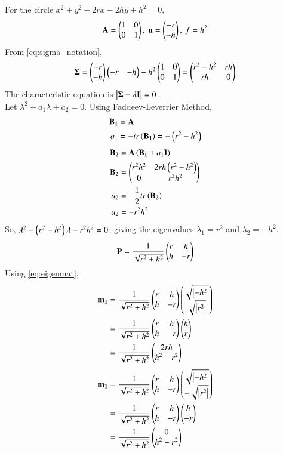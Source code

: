 \documentclass[journal]{IEEEtran}
\begin{document}
For the circle $x^2+y^2-2rx-2hy+h^2=0$,
\begin{align}
    \mathbf{A} = \begin{pmatrix}1 & 0 \\ 0 & 1\end{pmatrix},\text{ }\mathbf{u} = \begin{pmatrix}-r \\ -h\end{pmatrix},\text{ }f = h^2
\end{align}
From \eqref{eq:sigma_notation},
\begin{align}
    \mathbf{\Sigma} = \begin{pmatrix}-r \\ -h\end{pmatrix}\begin{pmatrix}-r & -h\end{pmatrix} - h^2\begin{pmatrix}1 & 0 \\ 0 & 1\end{pmatrix} = \begin{pmatrix}r^2-h^2 & rh \\ rh & 0\end{pmatrix}
\end{align}
The characteristic equation is $\begin{vmatrix}\mathbf{\Sigma}-\lambda\mathbf{I}\end{vmatrix}=0$. \\
Let $\lambda^2 + a_1 \lambda + a_2 = 0$. Using Faddeev-Leverrier Method,
\begin{align}
    \mathbf{B_1} &= \mathbf{A} \\
    a_1 &= - tr\left(\mathbf{B_1}\right) = -\left(r^2-h^2\right)
\end{align}
\begin{align}
    \mathbf{B_2} &= \mathbf{A}\left(\mathbf{B_1} + a_1\mathbf{I}\right) \\
    \mathbf{B_2} &= \begin{pmatrix}r^2h^2 & 2rh\left(r^2-h^2\right) \\ 0 & r^2h^2\end{pmatrix} \\
    a_2 &= -\frac{1}{2}tr\left(\mathbf{B_2}\right) \\
    a_2 &= -r^2h^2
\end{align}
So, $\lambda^2 - \left(r^2-h^2\right)\lambda - r^2h^2 = 0$, giving the eigenvalues $\lambda_1 = r^2$ and $\lambda_2 = -h^2$.
\begin{align}
    \mathbf{P} = \frac{1}{\sqrt{r^2+h^2}}\begin{pmatrix}r & h \\ h & -r\end{pmatrix}
\end{align}
Using \eqref{eq:eigenmat},
\begin{align}
    \mathbf{m_1} &= \frac{1}{\sqrt{r^2+h^2}}\begin{pmatrix}r & h \\ h & -r\end{pmatrix}\begin{pmatrix}\sqrt{\left\vert-h^2\right\vert} \\ \sqrt{\left\vert r^2\right\vert}\end{pmatrix} \\
    &= \frac{1}{\sqrt{r^2+h^2}}\begin{pmatrix}r & h \\ h & -r\end{pmatrix}\begin{pmatrix}h \\ r\end{pmatrix} \\
    &= \frac{1}{\sqrt{r^2+h^2}}\begin{pmatrix}2rh \\ h^2-r^2\end{pmatrix} \label{eq:equation1}
\end{align}
\begin{align}
    \mathbf{m_1} &= \frac{1}{\sqrt{r^2+h^2}}\begin{pmatrix}r & h \\ h & -r\end{pmatrix}\begin{pmatrix}\sqrt{\left\vert-h^2\right\vert} \\ -\sqrt{\left\vert r^2\right\vert}\end{pmatrix} \\
    &= \frac{1}{\sqrt{r^2+h^2}}\begin{pmatrix}r & h \\ h & -r\end{pmatrix}\begin{pmatrix}h \\ -r\end{pmatrix} \\
    &= \frac{1}{\sqrt{r^2+h^2}}\begin{pmatrix}0 \\ h^2+r^2\end{pmatrix} \label{eq:equation2}
\end{align}
\end{document}
